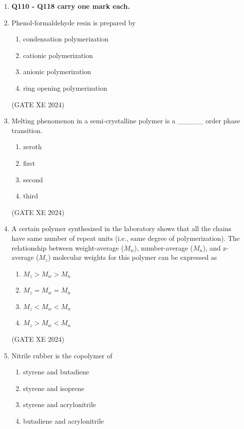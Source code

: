 \documentclass[12pt]{article}
\begin{document}
\begin{enumerate}
\newpage

\begin{center}
    {\Large \textbf{POLYMER SCIENCE AND ENGINEERING (XE - F)}}
\end{center}

\item[] \textbf{Q110 - Q118 carry one mark each.}
\item Phenol-formaldehyde resin is prepared by  
\begin{enumerate}
\item condensation polymerization  
\item cationic polymerization  
\item anionic polymerization  
\item ring opening polymerization  
\end{enumerate}

(GATE XE 2024)

\item Melting phenomenon in a semi-crystalline polymer is a \_\_\_\_\_ order phase transition.  
\begin{enumerate}
\item zeroth  
\item first  
\item second  
\item third  
\end{enumerate}

(GATE XE 2024)

\item A certain polymer synthesized in the laboratory shows that all the chains have same number of repeat units (i.e., same degree of polymerization). The relationship between weight-average ($M_w$), number-average ($M_n$), and z-average ($M_z$) molecular weights for this polymer can be expressed as  
\begin{enumerate}
\item $M_z > M_w > M_n$  
\item $M_z = M_w = M_n$  
\item $M_z < M_w < M_n$  
\item $M_z > M_w < M_n$  
\end{enumerate}  

(GATE XE 2024)

\item Nitrile rubber is the copolymer of  
\begin{enumerate}
\item styrene and butadiene  
\item styrene and isoprene  
\item styrene and acrylonitrile  
\item butadiene and acrylonitrile  
\end{enumerate}  


\end{enumerate}
\end{document}
